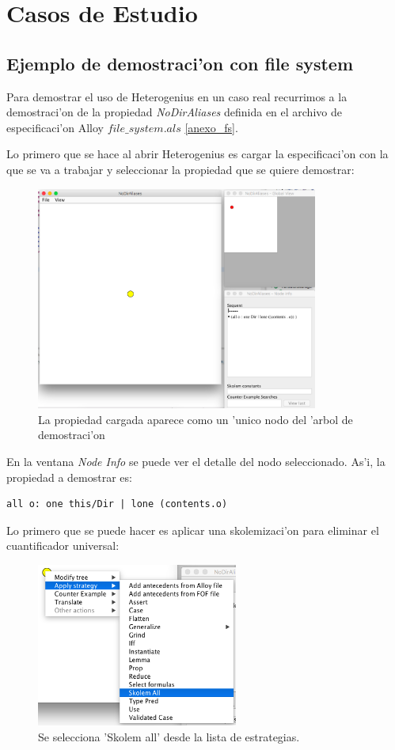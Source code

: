 \chapter{Casos de Estudio}

\section{Ejemplo de demostraci'on con file system}

Para demostrar el uso de Heterogenius en un caso real recurrimos a la demostraci'on de la propiedad \textit{NoDirAliases} definida en el archivo de especificaci'on Alloy \textit{$file\_system.als$} \ref{anexo_fs}.

Lo primero que se hace al abrir Heterogenius es cargar la especificaci'on con la que se va a trabajar y seleccionar la propiedad que se quiere demostrar:

\begin{figure}[H]
	\includegraphics[width=350px]{img/ejemplo/3.png}
	\centering
	\caption{La propiedad cargada aparece como un 'unico nodo del 'arbol de demostraci'on}
\end{figure}

En la ventana \textit{Node Info} se puede ver el detalle del nodo seleccionado. As'i, la propiedad a demostrar es:

\begin{verbatim}
all o: one this/Dir | lone (contents.o)
\end{verbatim}

Lo primero que se puede hacer es aplicar una skolemizaci'on para eliminar el cuantificador universal:

\begin{figure}[H]
	\includegraphics[width=250px]{img/ejemplo/4.png}
	\centering
	\caption{Se selecciona 'Skolem all' desde la lista de estrategias.}
\end{figure}

